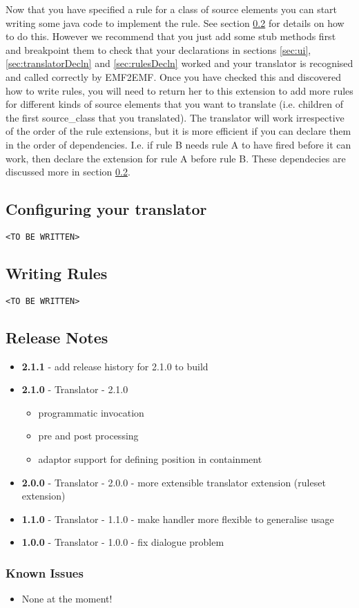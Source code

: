 	Now that you have specified a rule for a class of source elements you can start writing some java code to implement the rule. See section \ref{sec:rulesWriting} for details on how to do this. However we recommend that you just add some stub methods first and breakpoint them to check that your declarations in sections \ref{sec:ui}, \ref{sec:translatorDecln} and \ref{sec:rulesDecln} worked and your translator is recognised and called correctly by EMF2EMF. Once you have checked this and discovered how to write rules, you will need to return her to this extension to add more rules for different kinds of source elements that you want to translate (i.e. children of the first source\_class that you translated). The translator will work irrespective of the order of the rule extensions, but it is more efficient if you can declare them in the order of dependencies. I.e. if rule B needs rule A to have fired before it can work, then declare the extension for rule A before rule B. These dependecies are discussed more in section \ref{sec:rulesWriting}. 

\subsection{Configuring your translator}
\label{sec:configure}

\texttt{<TO BE WRITTEN>}

\subsection{Writing Rules}
\label{sec:rulesWriting}

\texttt{<TO BE WRITTEN>}

\subsection{Release Notes}
\label{sec:release-notes}

\begin{itemize}
\item \textbf{2.1.1} - add release history for 2.1.0 to build
\item \textbf{2.1.0} - Translator - 2.1.0
	\begin{itemize}
	\item programmatic invocation
	\item pre and post processing
	\item adaptor support for defining position in containment
	\end{itemize}
\item \textbf{2.0.0} - Translator - 2.0.0 - more extensible translator extension (ruleset extension)
\item \textbf{1.1.0} - Translator - 1.1.0 - make handler more flexible to generalise usage
\item \textbf{1.0.0} - Translator - 1.0.0 - fix dialogue problem
\end{itemize}

\subsubsection{Known Issues}
\label{sec:known-issues}

\begin{itemize}
\item None at the moment!
\end{itemize}


